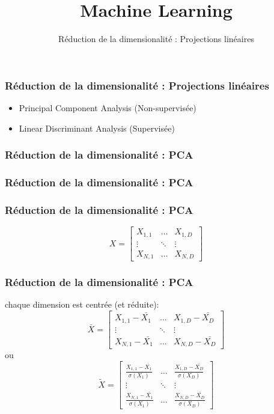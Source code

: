 \documentclass{formation}
\title{Machine Learning}
\subtitle{Réduction de la dimensionalité : Projections linéaires}
\begin{document}
\maketitle

\begin{frame}
  \frametitle{Réduction de la dimensionalité : Projections linéaires}
    \begin{itemize}
    \item Principal Component Analysis (Non-supervisée)
    \item Linear Discriminant Analysis (Supervisée)
    \end{itemize}
\end{frame}

\begin{frame}
  \frametitle{Réduction de la dimensionalité : PCA}
\end{frame}

\begin{frame}
  \frametitle{Réduction de la dimensionalité : PCA}
\end{frame}

\begin{frame}
  \frametitle{Réduction de la dimensionalité : PCA}
  \[
  X = \begin{bmatrix}
    X_{1,1} & \dots  & X_{1,D} \\
    \vdots & \ddots & \vdots \\
    X_{N,1} & \dots  & X_{N,D}
  \end{bmatrix}
  \]
\end{frame}

\begin{frame}
  \frametitle{Réduction de la dimensionalité : PCA}
  chaque dimension est centrée (et réduite):
  \[
  \bar{X} =
  \begin{bmatrix}
    X_{1,1}-\bar{X_1} & \dots  & X_{1,D}-\bar{X_D} \\
    \vdots & \ddots & \vdots \\
    X_{N,1}-\bar{X_1} & \dots  & X_{N,D}-\bar{X_D}
  \end{bmatrix}
  \]
  ou
  \[
  \tilde{X} =
  \begin{bmatrix}
    \frac{X_{1,1}-\bar{X_1}}{\sigma(X_1)} & \dots  & \frac{X_{1,D}-\bar{X_D}}{\sigma(X_D)} \\
    \vdots & \ddots & \vdots \\
    \frac{X_{N,1}-\bar{X_1}}{\sigma(X_1)} & \dots  & \frac{X_{N,D}-\bar{X_D}}{\sigma(X_D)}
  \end{bmatrix}
  \]
\end{frame}
\end{document}
